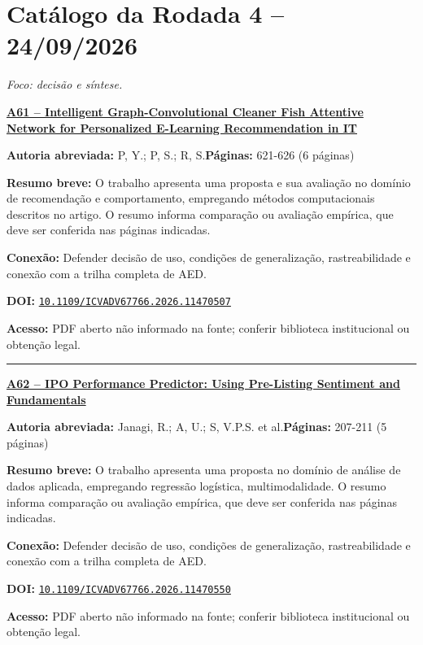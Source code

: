 \documentclass[10pt,a4paper]{article}
\begin{document}
\section*{Catálogo da Rodada 4 -- 24/09/2026}
\textit{Foco: decisão e síntese.}
\par\medskip\noindent
{\large\bfseries\href{https://doi.org/10.1109/ICVADV67766.2026.11470507}{A61 -- Intelligent Graph-Convolutional Cleaner Fish Attentive Network for Personalized E-Learning Recommendation in IT}}\par\smallskip
\textbf{Autoria abreviada:} P, Y.; P, S.; R, S.\quad \textbf{Páginas:} 621-626 (6 páginas)\par
\textbf{Resumo breve:} O trabalho apresenta uma proposta e sua avaliação no domínio de recomendação e comportamento, empregando métodos computacionais descritos no artigo. O resumo informa comparação ou avaliação empírica, que deve ser conferida nas páginas indicadas.\par
\textbf{Conexão:} Defender decisão de uso, condições de generalização, rastreabilidade e conexão com a trilha completa de AED.\par
\textbf{DOI:} \href{https://doi.org/10.1109/ICVADV67766.2026.11470507}{\nolinkurl{10.1109/ICVADV67766.2026.11470507}}\par
\textbf{Acesso:} PDF aberto não informado na fonte; conferir biblioteca institucional ou obtenção legal.\par
\noindent\rule{\textwidth}{0.35pt}
\par\medskip\noindent
{\large\bfseries\href{https://doi.org/10.1109/ICVADV67766.2026.11470550}{A62 -- IPO Performance Predictor: Using Pre-Listing Sentiment and Fundamentals}}\par\smallskip
\textbf{Autoria abreviada:} Janagi, R.; A, U.; S, V.P.S. et al.\quad \textbf{Páginas:} 207-211 (5 páginas)\par
\textbf{Resumo breve:} O trabalho apresenta uma proposta no domínio de análise de dados aplicada, empregando regressão logística, multimodalidade. O resumo informa comparação ou avaliação empírica, que deve ser conferida nas páginas indicadas.\par
\textbf{Conexão:} Defender decisão de uso, condições de generalização, rastreabilidade e conexão com a trilha completa de AED.\par
\textbf{DOI:} \href{https://doi.org/10.1109/ICVADV67766.2026.11470550}{\nolinkurl{10.1109/ICVADV67766.2026.11470550}}\par
\textbf{Acesso:} PDF aberto não informado na fonte; conferir biblioteca institucional ou obtenção legal.\par
\end{document}
